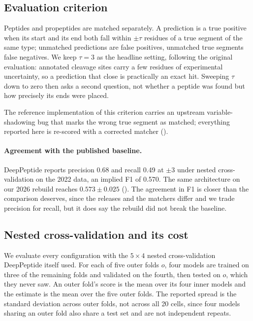 \documentclass{article}
\begin{document}
\subsection{Evaluation criterion}
\label{sec:matching}

Peptides and propeptides are matched separately. A prediction is a true positive when its start and its end both fall within $\pm\tau$ residues of a true segment of the same type; unmatched predictions are false positives, unmatched true segments false negatives. We keep $\tau=3$ as the headline setting, following the original evaluation: annotated cleavage sites carry a few residues of experimental uncertainty, so a prediction that close is practically an exact hit. Sweeping $\tau$ down to zero then asks a second question, not whether a peptide was found but how precisely its ends were placed.

The reference implementation of this criterion carries an upstream variable-shadowing bug that marks the wrong true segment as matched; everything reported here is re-scored with a corrected matcher ().

\paragraph{Agreement with the published baseline.} DeepPeptide reports precision 0.68 and recall 0.49 at $\pm3$ under nested cross-validation on the 2022 data, an implied F1 of 0.570. The same architecture on our 2026 rebuild reaches $0.573\pm0.025$ (). The agreement in F1 is closer than the comparison deserves, since the releases and the matchers differ and we trade precision for recall, but it does say the rebuild did not break the baseline.

\subsection{Nested cross-validation and its cost}
\label{sec:eval-protocol}

We evaluate every configuration with the $5\times4$ nested cross-validation DeepPeptide itself used. For each of five outer folds $o$, four models are trained on three of the remaining folds and validated on the fourth, then tested on $o$, which they never saw. An outer fold's score is the mean over its four inner models and the estimate is the mean over the five outer folds. The reported spread is the standard deviation across outer folds, not across all 20 cells, since four models sharing an outer fold also share a test set and are not independent repeats.
\end{document}
